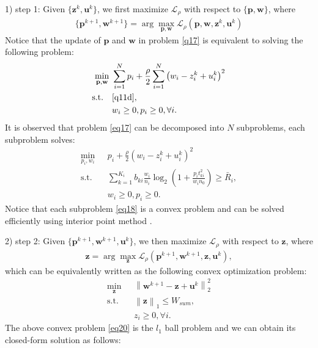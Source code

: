 \documentclass[journal]{IEEEtran}
\begin{document}
1) step 1: Given $\{\mathbf{z}^k, \mathbf{u}^k\}$, we first maximize $\mathcal{L}_\rho$ with respect to $\{\mathbf{p}, \mathbf{w}\}$, where
\begin{align}
\{\mathbf{p}^{k+1}, \mathbf{w}^{k+1}\} = \arg \max_{\mathbf{p}, \mathbf{w}} \mathcal{L}_\rho\left(\mathbf{p}, \mathbf{w}, \mathbf{z}^k, \mathbf{u}^k\right) \label{q17}
\end{align}
Notice that the update of $\mathbf{p}$ and $\mathbf{w}$ in problem \eqref{q17} is equivalent to solving the following problem:
\begin{subequations}\label{eq17}
	\begin{align}
	\min_{\mathbf{p}, \mathbf{w}}\ & \sum\limits_{i = 1}^{N} p_i + \frac{\rho}{2}\sum\limits_{i = 1}^{N}\left(w_i - z_i^k + u_i^k \right)^2  \label{q17a} \\ \mbox{s.t.} \quad &  \eqref{q11d},  \label{q17b} \\
	& w_i\geq 0, p_i \geq 0, \forall i. \label{q17c}
	\end{align}
\end{subequations}
It is observed that problem \eqref{eq17} can be decomposed into $N$ subproblems, each subproblem solves:
\begin{subequations}\label{eq18}
	\begin{align}
	\min_{p_i, w_i}\ & p_i + \frac{\rho}{2}\left(w_i - z_i^k + u_i^k \right)^2  \label{q18a} \\ \mbox{s.t.} \quad & \sum\limits_{k = 1}^{K_i}b_{ki}\frac{w_i}{n_i}\log_2\left(1 + \frac{p_it_{ki}^2}{w_in_0}\right) \geq \bar{R}_i,  \label{q18b} \\
	& w_i\geq 0, p_i \geq 0. \label{q18c}
	\end{align}
\end{subequations}
Notice that each subproblem \eqref{eq18} is a convex problem and can be solved efficiently using interior point method \cite{SBoyd3}.

2) step 2: Given $\{\mathbf{p}^{k+1}, \mathbf{w}^{k+1}, \mathbf{u}^k\}$, we then maximize $\mathcal{L}_\rho$ with respect to $\mathbf{z}$, where
\begin{align}
\mathbf{z} = \arg \max_{\mathbf{z}} \mathcal{L}_\rho\left(\mathbf{p}^{k+1}, \mathbf{w}^{k+1}, \mathbf{z}, \mathbf{u}^k\right),
\end{align} 
which can be equivalently written as the following convex optimization problem: 
\begin{subequations}\label{eq20}
	\begin{align}
	\min_{\mathbf{z}}\ & \left\|\mathbf{w}^{k+1} - \mathbf{z} + \mathbf{u}^k \right\|_2^2 \label{q20a} \\ \mbox{s.t.} \quad & \left\|\mathbf{z} \right\|_1 \leq W_{sum},  \label{q20b} \\
	& z_i\geq 0, \forall i. \label{q20c}
	\end{align}
\end{subequations}
The above convex problem \eqref{eq20} is the $l_1$ ball problem \cite{JDuchi} and we can obtain its closed-form solution as follows:
\end{document}
